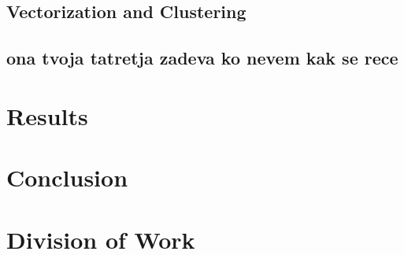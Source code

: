 \documentclass[12pt]{article}
\begin{document}
\subsection{Vectorization and Clustering}

\subsection{ona tvoja tatretja zadeva ko nevem kak se rece}

\section{Results}
\section{Conclusion}
\section{Division of Work}
	
	
\end{document}
